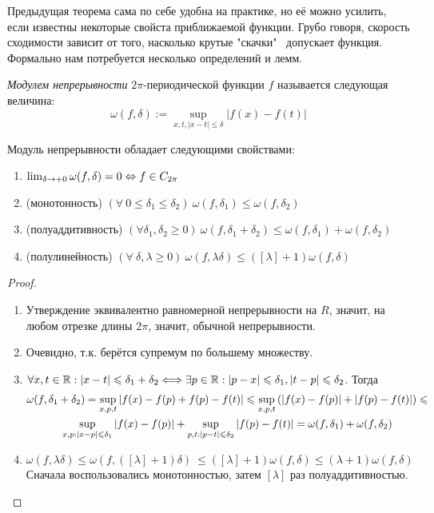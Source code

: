 Предыдущая теорема сама по себе удобна на практике, но её можно усилить, если известны некоторые свойста приближаемой функции. Грубо говоря, скорость сходимости зависит от того, насколько крутые "скачки" \ допускает функция. Формально нам потребуется несколько определений и лемм.

\begin{definition}
	\textit{Модулем непрерывности} $2\pi$-периодической функции $f$ называется следующая величина:
	\[
		\omega(f, \delta) := \sup_{x, t, |x - t| \leq \delta} |f(x) - f(t)|
	\]
\end{definition}

\begin{theorem}
	Модуль непрерывности обладает следующими свойствами:
	\begin{enumerate}
	\item
		$\lim_{\delta \to +0} \omega(f, \delta) = 0 \Leftrightarrow f \in C_{2\pi}$
	\item (монотонность)
		$(\forall \ 0 \leq \delta_1 \leq \delta_2) \ \omega(f, \delta_1) \leq \omega(f, \delta_2)$
	\item (полуаддитивность)
		$(\forall \delta_1, \delta_2 \geq 0) \ \omega(f, \delta_1 + \delta_2) \leq \omega(f, \delta_1) + \omega(f, \delta_2)$
	\item (полулинейность)
		$(\forall \ \delta, \lambda \geq 0) \ \omega(f, \lambda\delta) \leq ([\lambda] + 1)\omega(f, \delta)$
	\end{enumerate}
\end{theorem}

\begin{proof}
	\begin{enumerate}
	\item
		Утверждение эквивалентно равномерной непрерывности на $R$, значит, на любом отрезке длины $2\pi$, значит, обычной непрерывности. 
	\item
		Очевидно, т.к. берётся супремум по большему множеству.
	\item
		$\forall x, t \in \mathbb{R} : |x - t| \leqslant \delta_1 + \delta_2 \Longleftrightarrow \exists p \in \mathbb{R} : |p - x| \leqslant \delta_1, |t - p| \leqslant \delta_2$. Тогда
		\begin{multline*}
			\omega(f, \delta_1 + \delta_2) = \sup_{x,p,t}|f(x) - f(p) + f(p) - f(t)| \leqslant \sup_{x,p,t}\left(|f(x) - f(p)| + |f(p) - f(t)|\right) \leqslant \\ \sup_{x,p:|x - p| \leqslant \delta_1}|f(x) - f(p)| + \sup_{p,t:|p - t| \leqslant \delta_2}|f(p) - f(t)| = \omega(f, \delta_1) + \omega(f, \delta_2)
		\end{multline*}
	\item
		$\omega(f, \lambda\delta) \leq \omega(f, ([\lambda] + 1)\delta) \ \leq ([\lambda] + 1)\omega(f, \delta) \leq (\lambda + 1)\omega(f, \delta)$ \\
		Сначала воспользовались монотонностью, затем $[\lambda]$ раз полуаддитивностью.
	\end{enumerate}
\end{proof}

